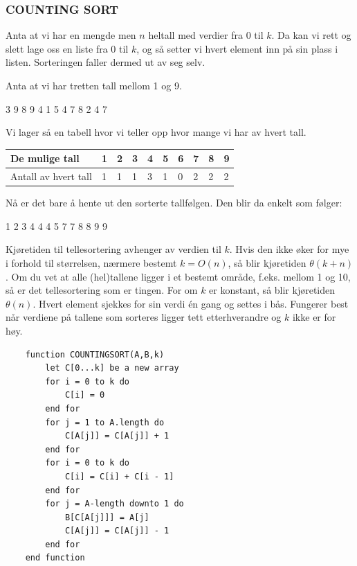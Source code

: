 \subsubsection{COUNTING SORT}
Anta at vi har en mengde men $n$ heltall med verdier fra 0 til $k$. Da kan vi rett og slett lage oss en liste fra 0 til $k$, og så setter vi hvert element inn på sin plass i listen. Sorteringen faller dermed ut av seg selv.

\begin{boxed}
Anta at vi har tretten tall mellom 1 og 9.
\begin{center}
3 9 8 9 4 1 5 4 7 8 2 4 7
\end{center}
Vi lager så en tabell hvor vi teller opp hvor mange vi har av hvert tall.

\begin{table}[H]
    \label{tab:tellesortering}
    \centering
    \begin{tabular}{|L{10em} | L{2em}|L{2em}|L{2em}|L{2em}|L{2em}|L{2em}|L{2em}|L{2em}|L{2em}|}
        \hline
        De mulige tall & 1 & 2 & 3 & 4 & 5 & 6 & 7 & 8 & 9\\
        \hline
        Antall av hvert tall & 1 & 1 & 1 & 3 & 1 & 0 & 2 & 2 & 2\\
         \hline
    \end{tabular}
\end{table}
Nå er det bare å hente ut den sorterte tallfølgen. Den blir da enkelt som følger:
\begin{center}
1 2 3 4 4 4 5 7 7 8 8 9 9
\end{center}
\end{boxed}

\noindent Kjøretiden til tellesortering avhenger av verdien til $k$. Hvis den ikke øker for mye i forhold til størrelsen, nærmere bestemt $k = O(n)$, så blir kjøretiden $\theta(k + n)$. Om du vet at alle (hel)tallene ligger i et bestemt område, f.eks. mellom 1 og 10, så er det tellesortering som er tingen. For om $k$ er konstant, så blir kjøretiden $\theta(n)$. Hvert element sjekkes for sin verdi én gang og settes i bås. Fungerer best når verdiene på tallene som sorteres ligger tett etterhverandre og $k$ ikke er for høy.

\begin{lstlisting}
    function COUNTINGSORT(A,B,k)
	    let C[0...k] be a new array
    	for i = 0 to k do
    		C[i] = 0
    	end for
    	for j = 1 to A.length do
    		C[A[j]] = C[A[j]] + 1
    	end for
    	for i = 0 to k do
    		C[i] = C[i] + C[i - 1]
    	end for
    	for j = A-length downto 1 do
    		B[C[A[j]]] = A[j]
    		C[A[j]] = C[A[j]] - 1
    	end for
    end function
\end{lstlisting}

